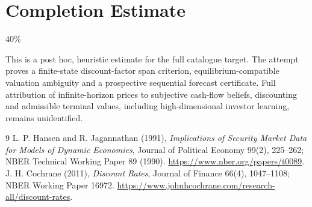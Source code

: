 \documentclass[11pt]{article}
\theoremstyle{definition}
\begin{document}
\section{Completion Estimate}
40\%

This is a post hoc, heuristic estimate for the full catalogue target.
The attempt proves a finite-state discount-factor span criterion, equilibrium-compatible valuation ambiguity and a prospective sequential forecast certificate. Full attribution of infinite-horizon prices to subjective cash-flow beliefs, discounting and admissible terminal values, including high-dimensional investor learning, remains unidentified.

\begin{thebibliography}{9}
 L. P. Hansen and R. Jagannathan (1991),
\emph{Implications of Security Market Data for Models of Dynamic Economies},
Journal of Political Economy 99(2), 225--262; NBER Technical Working Paper
89 (1990). \url{https://www.nber.org/papers/t0089}.
 J. H. Cochrane (2011), \emph{Discount Rates},
Journal of Finance 66(4), 1047--1108; NBER Working Paper 16972.
\url{https://www.johnhcochrane.com/research-all/discount-rates}.
\end{thebibliography}
\end{document}
